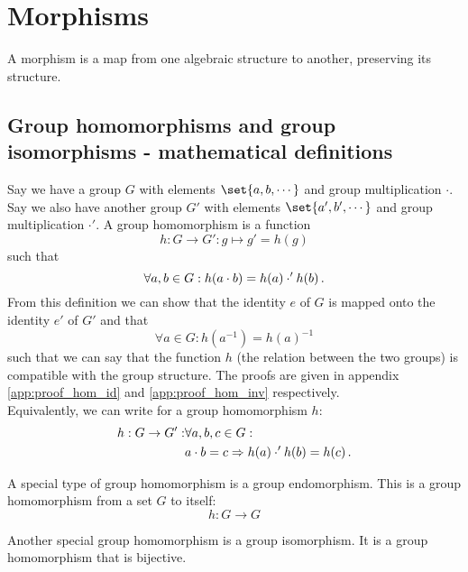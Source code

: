 \section{Morphisms}
    A morphism is a map from one algebraic structure to another, preserving its structure.

    \subsection{Group homomorphisms and group isomorphisms - mathematical definitions}
        Say we have a group $G$ with elements $\set{a, b, \cdots}$ and group multiplication $\cdot$. Say we also have another group $G'$ with elements $\set{a', b', \cdots}$ and group multiplication $\cdot'$. A group homomorphism is a function
        \begin{equation}
           h: G \rightarrow G': g \mapsto g' = h(g)
        \end{equation}
        such that
        \begin{equation}
           \forall a, b \in G: h(a \cdot b) = h(a) \cdot' h(b) \thinspace .
        \end{equation}
        From this definition we can show that the identity $e$ of $G$ is mapped onto the identity $e'$ of $G'$ and that
        \begin{equation}
           \forall a \in G: h(a^{-1}) = h(a)^{-1}
        \end{equation}
        such that we can say that the function $h$ (the relation between the two groups) is compatible with the group structure. The proofs are given in appendix \ref{app:proof_hom_id} and \ref{app:proof_hom_inv} respectively. \\

        Equivalently, we can write for a group homomorphism $h$:
        \begin{align}
            h: G \rightarrow G': &\forall a, b, c \in G: \\
            &a \cdot b = c \Rightarrow h(a) \cdot' h(b) = h(c) \thinspace .
        \end{align}

        A special type of group homomorphism is a group endomorphism. This is a group homomorphism from a set $G$ to itself:
        \begin{equation}
            h: G \rightarrow G
        \end{equation}

        Another special group homomorphism is a group isomorphism. It is a group homomorphism that is bijective. \\

